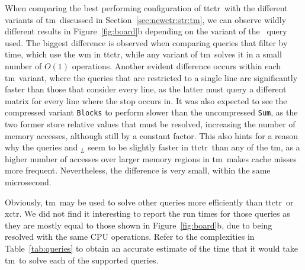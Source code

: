     \medskip
    When comparing the best performing configuration of \gls{ttctr}~with the different variants of \gls{tm}~discussed in Section~\ref{sec:newctr:str:tm}, we can observe wildly different results in Figure~\ref{fig:board}b depending on the variant of the \boardX~query used. The biggest difference is observed when comparing queries that filter by time, which use the \gls{wm} in \gls{ttctr}, while any variant of \gls{tm}~solves it in a small number of $O(1)$ operations. Another evident difference occurs within each \gls{tm}~variant, where the queries that are restricted to a single line are significantly faster than those that consider every line, as the latter must query a different matrix for every line where the stop occurs in. It was also expected to see the compressed variant \texttt{Blocks} to perform slower than the uncompressed \texttt{Sum}, as the two former store relative values that must be resolved, increasing the number of memory accesses, although still by a constant factor. This also hints for a reason why the queries \boardX and \boardX$_{L}$ seem to be slightly faster in \gls{ttctr}~than any of the \gls{tm}, as a higher number of accesses over larger memory regions in \gls{tm}~makes cache misses more frequent. Nevertheless, the difference is very small, within the same microsecond.
    
    Obviously, \gls{tm}~may be used to solve other queries more efficiently than \gls{ttctr}~or \gls{xctr}. We did not find it interesting to report the run times for those queries as they are mostly equal to those shown in Figure~\ref{fig:board}b, due to being resolved with the same CPU operations. Refer to the complexities in Table~\ref{tab:queries} to obtain an accurate estimate of the time that it would take \gls{tm}~to solve each of the supported queries.
